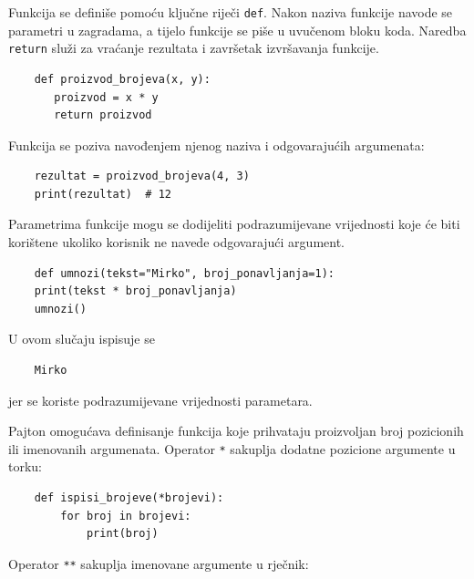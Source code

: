 Funkcija se definiše pomoću ključne riječi \texttt{def}. Nakon naziva funkcije navode se parametri u zagradama, a tijelo funkcije se piše u uvučenom bloku koda. Naredba \texttt{return} služi za vraćanje rezultata i završetak izvršavanja funkcije.

\begin{verbatim}
	def proizvod_brojeva(x, y):
	   proizvod = x * y
	   return proizvod
\end{verbatim}

Funkcija se poziva navođenjem njenog naziva i odgovarajućih argumenata:

\begin{verbatim}
	rezultat = proizvod_brojeva(4, 3)
	print(rezultat)  # 12
\end{verbatim}


Parametrima funkcije mogu se dodijeliti podrazumijevane vrijednosti koje će biti korištene ukoliko korisnik ne navede odgovarajući argument.

\begin{verbatim}
	def umnozi(tekst="Mirko", broj_ponavljanja=1):
	print(tekst * broj_ponavljanja)
	umnozi()
\end{verbatim}

U ovom slučaju ispisuje se

\begin{verbatim}
	Mirko
\end{verbatim}

jer se koriste podrazumijevane vrijednosti parametara.


Pajton omogućava definisanje funkcija koje prihvataju proizvoljan broj pozicionih ili imenovanih argumenata.  Operator \texttt{*} sakuplja dodatne pozicione argumente u torku:

\begin{verbatim}
	def ispisi_brojeve(*brojevi):
	    for broj in brojevi:
	        print(broj)
\end{verbatim}

Operator \texttt{**} sakuplja imenovane argumente u rječnik:


